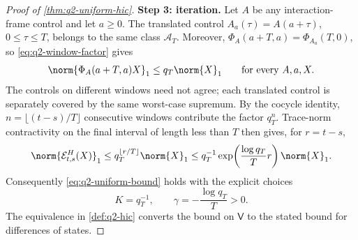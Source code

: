 \documentclass[class=article,11pt,a4paper,crop=false]{standalone}
\begin{document}
\begin{proof}[Proof of \cref{thm:q2-uniform-hic}]
\textbf{Step 3: iteration.}
Let $A$ be any interaction-frame control and let $a\ge0$. The translated
control $A_a(\tau)=A(a+\tau)$, $0\le\tau\le T$, belongs to the same class
$\mathcal A_T$. Moreover,
$\Phi_A(a+T,a)=\Phi_{A_a}(T,0)$, so
\eqref{eq:q2-window-factor} gives
\begin{equation}
 \norm{\Phi_A(a+T,a)X}_1\le q_T\norm{X}_1
 \qquad\text{for every }A,a,X.
\end{equation}
The controls on different windows need not agree; each translated control is
separately covered by the same worst-case supremum. By the cocycle identity,
$n=\lfloor(t-s)/T\rfloor$ consecutive windows contribute the factor $q_T^n$.
Trace-norm contractivity on the final interval
of length less than $T$ then gives, for $r=t-s$,
\begin{equation}
 \norm{\mathcal E^H_{t,s}(X)}_1
 \le q_T^{\lfloor r/T\rfloor}\norm{X}_1
 \le q_T^{-1}\exp\!\left(\frac{\log q_T}{T}r\right)\norm{X}_1.
\end{equation}
Consequently \eqref{eq:q2-uniform-bound} holds with the explicit choices
\begin{equation}
  K=q_T^{-1},\qquad \gamma=-\frac{\log q_T}{T}>0.
\end{equation}
The equivalence in \cref{def:q2-hic} converts the bound on $\mathsf V$ to the
stated bound for differences of states.
\end{proof}
\end{document}
